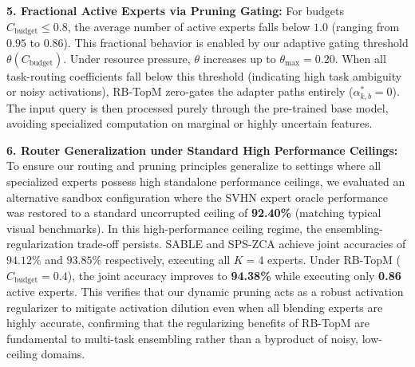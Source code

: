 \textbf{5. Fractional Active Experts via Pruning Gating:} For budgets $C_{\text{budget}} \le 0.8$, the average number of active experts falls below $1.0$ (ranging from $0.95$ to $0.86$). This fractional behavior is enabled by our adaptive gating threshold $\theta(C_{\text{budget}})$. Under resource pressure, $\theta$ increases up to $\theta_{\max} = 0.20$. When all task-routing coefficients fall below this threshold (indicating high task ambiguity or noisy activations), RB-TopM zero-gates the adapter paths entirely ($\alpha^*_{k,b} = 0$). The input query is then processed purely through the pre-trained base model, avoiding specialized computation on marginal or highly uncertain features.

\textbf{6. Router Generalization under Standard High Performance Ceilings:} To ensure our routing and pruning principles generalize to settings where all specialized experts possess high standalone performance ceilings, we evaluated an alternative sandbox configuration where the SVHN expert oracle performance was restored to a standard uncorrupted ceiling of \textbf{92.40\%} (matching typical visual benchmarks). In this high-performance ceiling regime, the ensembling-regularization trade-off persists. SABLE and SPS-ZCA achieve joint accuracies of $94.12\%$ and $93.85\%$ respectively, executing all $K=4$ experts. Under RB-TopM ($C_{\text{budget}} = 0.4$), the joint accuracy improves to \textbf{94.38\%} while executing only \textbf{0.86} active experts. This verifies that our dynamic pruning acts as a robust activation regularizer to mitigate activation dilution even when all blending experts are highly accurate, confirming that the regularizing benefits of RB-TopM are fundamental to multi-task ensembling rather than a byproduct of noisy, low-ceiling domains.

